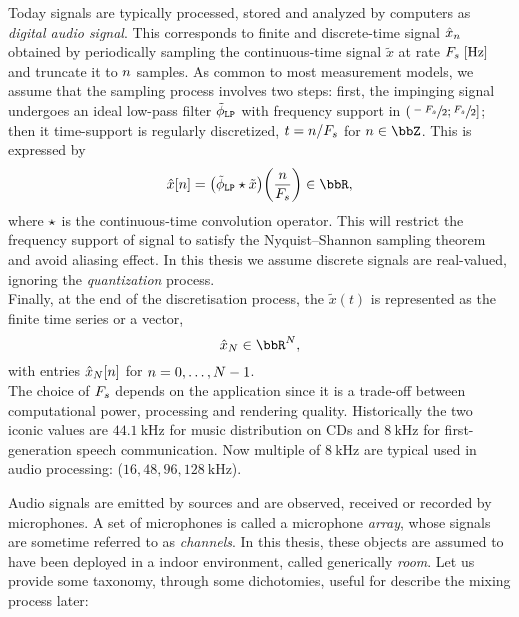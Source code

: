 Today signals are typically processed, stored and analyzed by computers as \textit{digital audio signal}.
This corresponds to finite and discrete-time signal $\hat{x}_{n}$ obtained by periodically sampling the continuous-time signal $\tilde{x}$ at rate $\Fs\;[\si{\Hz}]$ and truncate it to $n$ samples.
As common to most measurement models, we assume that the sampling process involves two steps:
first, the impinging signal undergoes an ideal low-pass filter $\lowpassfilter$ with frequency support in $\kintervoc{\sfrac{-\Fs}{2}}{\sfrac{\Fs}{2}}$;
then it time-support is regularly discretized, $t = n/F_s$ for $n \in \Z$. This is expressed by
\begin{equation}
    \discTime[\idxSample]{\mic} = \kparen{\lowpassfilter \convCont \tilde{x}}\kparen{\frac{n}{\Fs}} \in \R
    ,
\end{equation}
where $\star$ is the continuous-time convolution operator.
This will restrict the frequency support of signal to satisfy the Nyquist–Shannon sampling theorem and avoid aliasing effect.
In this thesis we assume discrete signals are real-valued, ignoring the \textit{quantization} process.
\\Finally, at the end of the discretisation process, the $\tilde{x}(t)$ is represented as the finite time series or a vector,
\begin{equation}
    \hat{\mic}_{\numSample} \in \R^{\numSample}
    ,
\end{equation}
with entries $\hat{x}_{N}[n]$ for $n = 0, \ldots, N-1$.
\\The choice of $F_s$ depends on the application since it is a trade-off between computational power, processing and rendering quality.
Historically the two iconic values are $\SI{44.1}{\kHz}$ for music distribution on CDs and $\SI{8}{\kHz}$ for first-generation speech communication.
Now multiple of $\SI{8}{\kHz}$ are typical used in audio processing: ($16, 48, 96, \SI{128}{\kHz}$).

\mynewline
Audio signals are emitted by sources and are observed, received or recorded by microphones.
A set of microphones is called a microphone \textit{array}, whose signals are sometime referred to as \textit{channels}.
In this thesis, these objects are assumed to have been deployed in a indoor environment, called generically \textit{room}.
Let us provide some taxonomy, through some dichotomies, useful for describe the mixing process later:

